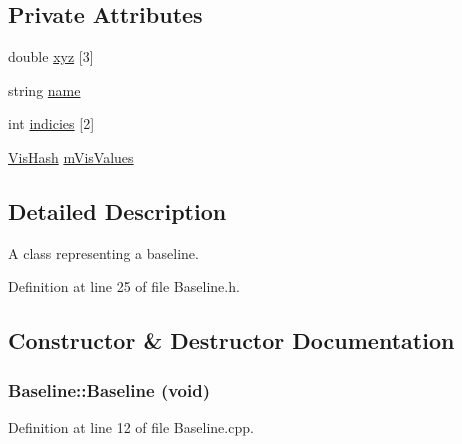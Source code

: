 \subsection*{Private Attributes}
\begin{DoxyCompactItemize}
\item 
double \hyperlink{classBaseline_a433e589e07963e5bf6c3902795997ef2}{xyz} \mbox{[}3\mbox{]}
\item 
string \hyperlink{classBaseline_a2e756765673499ebf05fedaa1011f717}{name}
\item 
int \hyperlink{classBaseline_af8afd0de67e28cd19f78691d203cb263}{indicies} \mbox{[}2\mbox{]}
\item 
\hyperlink{Baseline_8h_acec5ba98056573624e8846d16f0baee6}{VisHash} \hyperlink{classBaseline_a5007d2e286e10dd8c4651422df9b1dcc}{mVisValues}
\end{DoxyCompactItemize}


\subsection{Detailed Description}
A class representing a baseline. 

Definition at line 25 of file Baseline.h.



\subsection{Constructor \& Destructor Documentation}
\hypertarget{classBaseline_afe029a1f3f85da82f45e19ab13f4a382}{
\subsubsection[{Baseline}]{\setlength{\rightskip}{0pt plus 5cm}Baseline::Baseline (void)}}
\label{classBaseline_afe029a1f3f85da82f45e19ab13f4a382}


Definition at line 12 of file Baseline.cpp.

